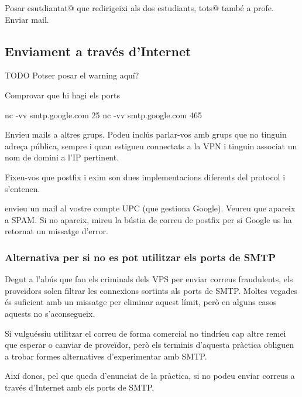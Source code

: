 \documentclass{practicaitic}
\begin{document}
\begin{tasca}
  Posar esutdiantat@ que redirigeixi als dos estudiants, tots@ també a profe. Enviar mail.
\end{tasca}

\subsection{Enviament a través d'Internet}

TODO Potser posar el warning aquí?

\begin{previ}
  Comprovar que hi hagi els ports

  nc -vv smtp.google.com 25
  nc -vv smtp.google.com 465
\end{previ}

\begin{tasca}
  Envieu mails a altres grups. Podeu inclús parlar-vos amb grups
  que no tinguin adreça pública, sempre i quan estigueu connectats
  a la VPN i tinguin associat un nom de domini a l'IP pertinent.

  Fixeu-vos que postfix
  i exim son dues implementacions diferents del protocol i s'entenen.
\end{tasca}

\begin{tasca}
  envieu un mail al vostre compte UPC (que gestiona Google). Veureu que apareix a SPAM.
  Si no apareix, mireu la bústia de correu de postfix per si
  Google us ha retornat un missatge d'error.
\end{tasca}

\subsubsection{Alternativa per si no es pot utilitzar els ports de SMTP}
\label{sec:plan-b}

Degut a l'abús que fan els criminals dels VPS per enviar correus
fraudulents, els proveïdors solen filtrar les connexions sortints
als ports de SMTP. Moltes vegades és suficient amb un missatge per
eliminar aquest límit, però en alguns casos aquests no s'aconsegueix.

Si vulguéssiu utilitzar el correu de forma comercial no tindríeu cap
altre remei que esperar o canviar de proveïdor, però els terminis
d'aquesta pràctica obliguen a trobar formes alternatives d'experimentar
amb SMTP.

Així doncs, pel que queda d'enunciat de la pràctica, si no podeu
enviar correus a través d'Internet amb els ports de SMTP, 
\end{document}

